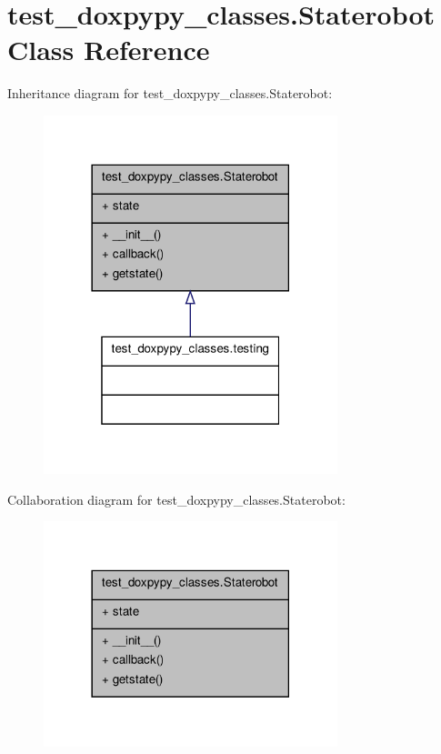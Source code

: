 \hypertarget{classtest__doxpypy__classes_1_1_staterobot}{\section{test\+\_\+doxpypy\+\_\+classes.\+Staterobot Class Reference}
\label{classtest__doxpypy__classes_1_1_staterobot}
}


Inheritance diagram for test\+\_\+doxpypy\+\_\+classes.\+Staterobot\+:
\nopagebreak
\begin{figure}[H]
\begin{center}
\leavevmode
\includegraphics[width=242pt]{classtest__doxpypy__classes_1_1_staterobot__inherit__graph}
\end{center}
\end{figure}


Collaboration diagram for test\+\_\+doxpypy\+\_\+classes.\+Staterobot\+:
\nopagebreak
\begin{figure}[H]
\begin{center}
\leavevmode
\includegraphics[width=242pt]{classtest__doxpypy__classes_1_1_staterobot__coll__graph}
\end{center}
\end{figure}
